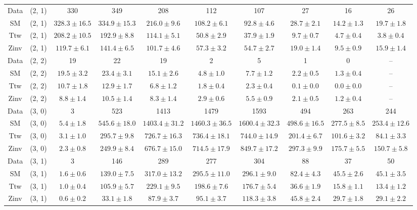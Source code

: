 \begin{table}[h!]
{\begin{tabular}{cccccccccc}
	Data & (2, 1) & 330 & 349 & 208 & 112 & 107 & 27 & 16 & 26 \\[0.5ex] 
	SM & (2, 1) & $328.3\pm 16.5$ & $334.9\pm 15.3$ & $216.0\pm 9.6$ & $108.2\pm 6.1$ & $92.8\pm 4.6$ & $28.7\pm 2.1$ & $14.2\pm 1.3$ & $19.7\pm 1.8$ \\[0.5ex] 
	Ttw & (2, 1) & $208.2\pm 10.5$ & $192.9\pm 8.8$ & $114.1\pm 5.1$ & $50.8\pm 2.9$ & $37.9\pm 1.9$ & $9.7\pm 0.7$ & $4.7\pm 0.4$ & $3.8\pm 0.4$ \\[0.5ex] 
	Zinv & (2, 1) & $119.7\pm 6.1$ & $141.4\pm 6.5$ & $101.7\pm 4.6$ & $57.3\pm 3.2$ & $54.7\pm 2.7$ & $19.0\pm 1.4$ & $9.5\pm 0.9$ & $15.9\pm 1.4$ \\[0.5ex] 
	Data & (2, 2) & 19 & 22 & 19 & 2 & 5 & 1 & 0 & -- \\[0.5ex] 
	SM & (2, 2) & $19.5\pm 3.2$ & $23.4\pm 3.1$ & $15.1\pm 2.6$ & $4.8\pm 1.0$ & $7.7\pm 1.2$ & $2.2\pm 0.5$ & $1.3\pm 0.4$ & -- \\[0.5ex] 
	Ttw & (2, 2) & $10.7\pm 1.8$ & $12.9\pm 1.7$ & $6.8\pm 1.2$ & $1.8\pm 0.4$ & $2.3\pm 0.4$ & $0.1\pm 0.0$ & $0.0\pm 0.0$ & -- \\[0.5ex] 
	Zinv & (2, 2) & $8.8\pm 1.4$ & $10.5\pm 1.4$ & $8.3\pm 1.4$ & $2.9\pm 0.6$ & $5.5\pm 0.9$ & $2.1\pm 0.5$ & $1.2\pm 0.4$ & -- \\[0.5ex] 
	Data & (3, 0) & 3 & 523 & 1413 & 1479 & 1593 & 494 & 263 & 244 \\[0.5ex] 
	SM & (3, 0) & $5.4\pm 1.8$ & $545.6\pm 18.0$ & $1403.4\pm 31.2$ & $1460.3\pm 36.5$ & $1600.4\pm 32.3$ & $498.6\pm 16.5$ & $277.5\pm 8.5$ & $253.4\pm 12.6$ \\[0.5ex] 
	Ttw & (3, 0) & $3.1\pm 1.0$ & $295.7\pm 9.8$ & $726.7\pm 16.3$ & $736.4\pm 18.1$ & $744.0\pm 14.9$ & $201.4\pm 6.7$ & $101.6\pm 3.2$ & $84.1\pm 3.3$ \\[0.5ex] 
	Zinv & (3, 0) & $2.3\pm 0.8$ & $249.9\pm 8.4$ & $676.7\pm 15.0$ & $714.5\pm 17.9$ & $849.7\pm 17.2$ & $297.3\pm 9.9$ & $175.7\pm 5.5$ & $150.7\pm 5.8$ \\[0.5ex] 
	Data & (3, 1) & 3 & 146 & 289 & 277 & 304 & 88 & 37 & 50 \\[0.5ex] 
	SM & (3, 1) & $1.6\pm 0.6$ & $139.0\pm 7.5$ & $317.0\pm 13.2$ & $295.5\pm 11.0$ & $296.1\pm 9.0$ & $82.4\pm 4.3$ & $45.5\pm 2.6$ & $45.1\pm 3.5$ \\[0.5ex] 
	Ttw & (3, 1) & $1.0\pm 0.4$ & $105.9\pm 5.7$ & $229.1\pm 9.5$ & $198.6\pm 7.6$ & $176.7\pm 5.4$ & $36.6\pm 1.9$ & $15.8\pm 1.1$ & $13.4\pm 1.2$ \\[0.5ex] 
	Zinv & (3, 1) & $0.6\pm 0.2$ & $33.1\pm 1.8$ & $87.9\pm 3.7$ & $95.1\pm 3.7$ & $118.3\pm 3.8$ & $45.8\pm 2.4$ & $29.7\pm 1.8$ & $29.1\pm 2.2$ \\[0.5ex] 

\end{tabular}}
\end{table}
